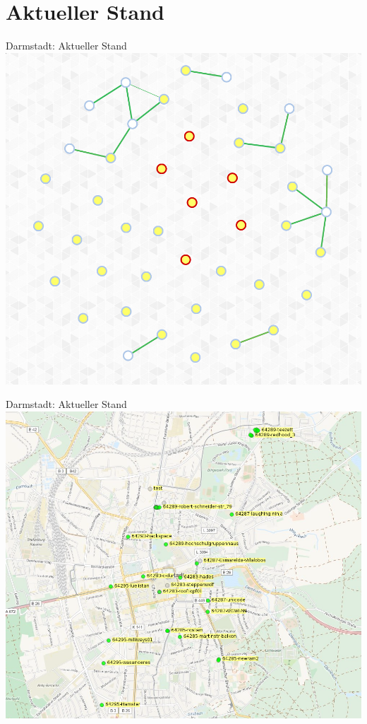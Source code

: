 \documentclass{beamer}
\begin{document}
\section{Aktueller Stand}
\begin{frame}{Darmstadt: Aktueller Stand}
\vfill
\centering
\includegraphics[scale=0.25]{images/darmstadt-graph}
\vfill
\end{frame}

\begin{frame}{Darmstadt: Aktueller Stand}
\vfill
\centering
\includegraphics[height=0.85\textheight]{images/darmstadt-map}
\vfill
\end{frame}
\end{document}
